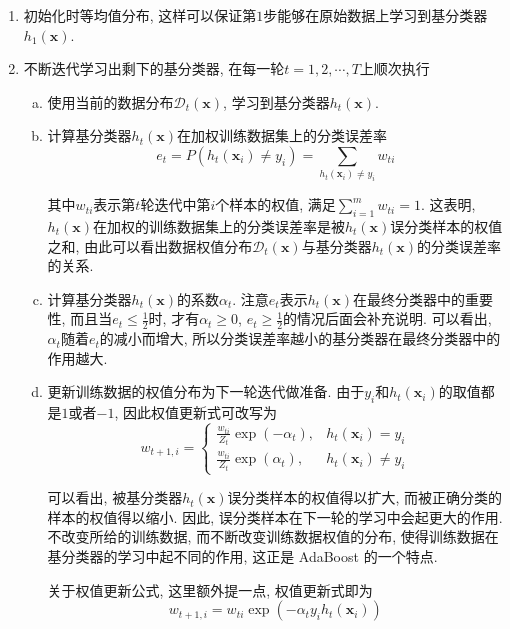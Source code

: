\documentclass[a4paper,UTF8]{ctexart}
\theoremstyle{plain} \newtheorem{theorem}{定理}[section]
\theoremstyle{plain} \newtheorem{definition}{定义}[section]
\theoremstyle{plain} \newtheorem{lemma}{引理}[section]
\theoremstyle{plain} \newtheorem{proposition}{命题}[section]
\theoremstyle{plain} \newtheorem{example}{例}[section]
\theoremstyle{plain} \newtheorem{remark}{注}[section]
\theoremstyle{plain} \newtheorem{corollary}{推论}[section]
\begin{document}
\begin{enumerate}[(1)]
\item 初始化时等均值分布, 这样可以保证第$1$步能够在原始数据上学习到基分类器$h_{1}(\bm{x})$.

\item 不断迭代学习出剩下的基分类器, 在每一轮$t=1,2,\cdots, T$上顺次执行
\begin{enumerate}[(a)]
\item 使用当前的数据分布$\mathcal{D}_{t}(\bm{x})$, 学习到基分类器$h_{t}(\bm{x})$.

\item 计算基分类器$h_{t}(\bm{x})$在加权训练数据集上的分类误差率
\begin{equation*}
e_{t} = P(h_{t}(\bm{x}_i) \neq y_i) = \sum_{h_{t}(\bm{x}_i) \neq y_i} w_{ti}
\end{equation*}

其中$w_{ti}$表示第$t$轮迭代中第$i$个样本的权值, 满足$\sum\limits_{i=1}^{m}w_{ti} = 1$. 这表明, $h_{t}(\bm{x})$在加权的训练数据集上的分类误差率是被$h_{t}(\bm{x})$误分类样本的权值之和, 由此可以看出数据权值分布$\mathcal{D}_{t}(\bm{x})$与基分类器$h_{t}(\bm{x})$的分类误差率的关系.

\item 计算基分类器$h_{t}(\bm{x})$的系数$\alpha_{t}$. 注意$e_{t}$表示$h_{t}(\bm{x})$在最终分类器中的重要性, 而且当$e_{t} \leqslant \frac{1}{2}$时, 才有$\alpha_{t} \geqslant 0$, $e_{t} \geqslant \frac{1}{2}$的情况后面会补充说明. 可以看出, $\alpha_{t}$随着$e_{t}$的减小而增大, 所以分类误差率越小的基分类器在最终分类器中的作用越大.

\item 更新训练数据的权值分布为下一轮迭代做准备. 由于$y_{i}$和$h_{t}(\bm{x}_i)$的取值都是$1$或者$-1$, 因此权值更新式可改写为
$$
w_{t+1,i} = 
\begin{cases}
\frac{w_{ti}}{Z_t} \exp(- \alpha_{t}), & h_{t}(\bm{x}_i) = y_i \\ 
\frac{w_{ti}}{Z_t} \exp(\alpha_{t}), & h_{t}(\bm{x}_i) \neq y_i
\end{cases}
$$

可以看出, 被基分类器$h_{t}(\bm{x})$误分类样本的权值得以扩大, 而被正确分类的样本的权值得以缩小. 因此, 误分类样本在下一轮的学习中会起更大的作用. 不改变所给的训练数据, 而不断改变训练数据权值的分布, 使得训练数据在基分类器的学习中起不同的作用, 这正是 AdaBoost 的一个特点.

关于权值更新公式, 这里额外提一点, 权值更新式即为
\begin{equation*}
w_{t+1,i} = w_{ti} \exp (- \alpha_{t} y_{i} h_{t}(\bm{x}_i))
\end{equation*}


\end{enumerate}
\end{enumerate}
\end{document}
